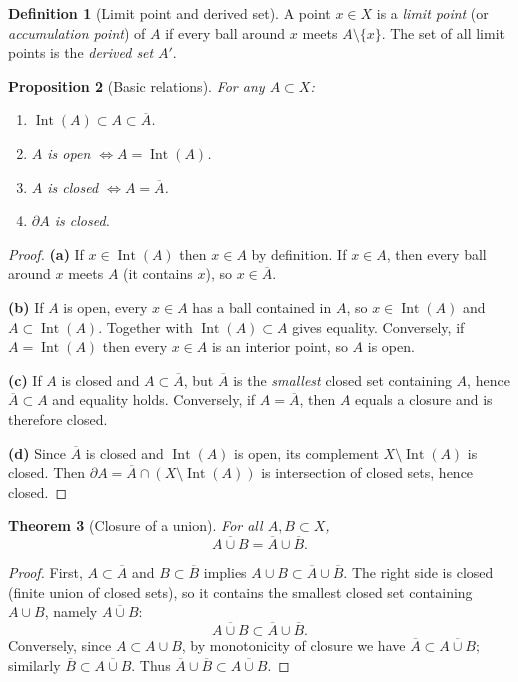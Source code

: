 \documentclass[11pt]{article}
\newtheorem{theorem}{Theorem}[section]
\newtheorem{proposition}[theorem]{Proposition}
\theoremstyle{definition}
\newtheorem{definition}[theorem]{Definition}
\newcommand{\ol}[1]{\overline{#1}}
\newcommand{\Int}{\operatorname{Int}}
\newcommand{\Bd}{\partial}
\begin{document}
\begin{definition}[Limit point and derived set]
A point $x\in X$ is a \emph{limit point} (or \emph{accumulation point}) of $A$ if every ball around $x$ meets $A\setminus\{x\}$.
The set of all limit points is the \emph{derived set} $A'$.
\end{definition}

\begin{proposition}[Basic relations]
For any $A\subset X$:
\begin{enumerate}[label=\textbf{(\alph*)}]
\item $\Int(A)\subset A\subset \ol A$.
\item $A$ is open $\iff A=\Int(A)$.
\item $A$ is closed $\iff A=\ol A$.
\item $\Bd A$ is closed.
\end{enumerate}
\end{proposition}

\begin{proof}
\textbf{(a)} If $x\in\Int(A)$ then $x\in A$ by definition. If $x\in A$, then every ball around $x$ meets $A$ (it contains $x$),
so $x\in\ol A$.

\textbf{(b)} If $A$ is open, every $x\in A$ has a ball contained in $A$, so $x\in\Int(A)$ and $A\subset\Int(A)$.
Together with $\Int(A)\subset A$ gives equality.
Conversely, if $A=\Int(A)$ then every $x\in A$ is an interior point, so $A$ is open.

\textbf{(c)} If $A$ is closed and $A\subset \ol A$, but $\ol A$ is the \emph{smallest} closed set containing $A$, hence $\ol A\subset A$ and equality holds.
Conversely, if $A=\ol A$, then $A$ equals a closure and is therefore closed.

\textbf{(d)} Since $\ol A$ is closed and $\Int(A)$ is open, its complement $X\setminus\Int(A)$ is closed.
Then $\Bd A=\ol A\cap (X\setminus\Int(A))$ is intersection of closed sets, hence closed.
\end{proof}

\begin{theorem}[Closure of a union]
For all $A,B\subset X$,
\[
\ol{A\cup B}=\ol A\cup \ol B.
\]
\end{theorem}

\begin{proof}
First, $A\subset \ol A$ and $B\subset \ol B$ implies $A\cup B\subset \ol A\cup \ol B$.
The right side is closed (finite union of closed sets), so it contains the smallest closed set containing $A\cup B$, namely $\ol{A\cup B}$:
\[
\ol{A\cup B}\subset \ol A\cup \ol B.
\]
Conversely, since $A\subset A\cup B$, by monotonicity of closure we have $\ol A\subset \ol{A\cup B}$; similarly $\ol B\subset \ol{A\cup B}$.
Thus $\ol A\cup \ol B\subset \ol{A\cup B}$.
\end{proof}
\end{document}
